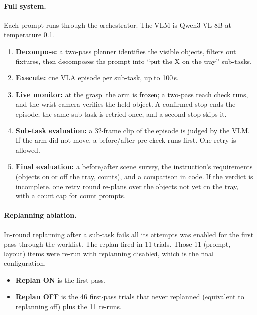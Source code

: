 \paragraph{Full system.} Each prompt runs through the orchestrator. The VLM is
Qwen3-VL-8B at temperature 0.1.
\begin{enumerate}
  \item \textbf{Decompose:} a two-pass planner identifies the visible objects, filters out
    fixtures, then decomposes the prompt into ``put the X on the tray'' sub-tasks.
  \item \textbf{Execute:} one VLA episode per sub-task, up to 100\,s.
  \item \textbf{Live monitor:} at the grasp, the arm is frozen; a two-pass reach check
    runs, and the wrist camera verifies the held object. A confirmed stop ends the
    episode; the same sub-task is retried once, and a second stop skips it.
  \item \textbf{Sub-task evaluation:} a 32-frame clip of the episode is judged by the VLM.
    If the arm did not move, a before/after pre-check runs first. One retry is allowed.
  \item \textbf{Final evaluation:} a before/after scene survey, the instruction's
    requirements (objects on or off the tray, counts), and a comparison in code. If the
    verdict is incomplete, one retry round re-plans over the objects not yet on the tray,
    with a count cap for count prompts.
\end{enumerate}

\paragraph{Replanning ablation.} In-round replanning after a sub-task fails all its
attempts was enabled for the first pass through the worklist. The replan fired in 11
trials. Those 11 (prompt, layout) items were re-run with replanning disabled, which is the
final configuration.
\begin{itemize}
  \item \textbf{Replan ON} is the first pass.
  \item \textbf{Replan OFF} is the 46 first-pass trials that never replanned (equivalent
    to replanning off) plus the 11 re-runs.
\end{itemize}

